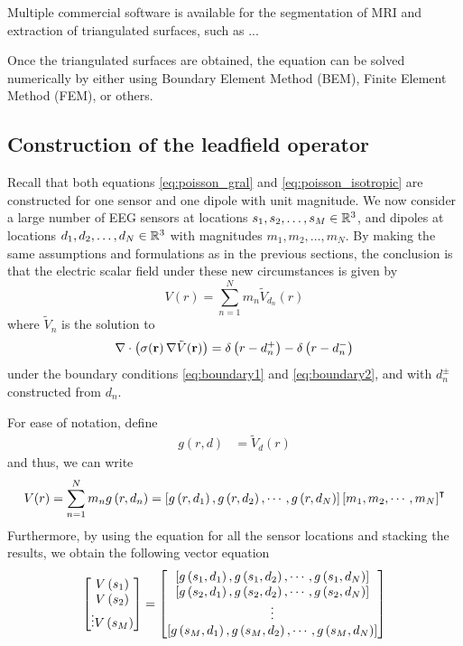 Multiple commercial software is available for the segmentation of MRI and extraction of triangulated surfaces, such as ...

Once the triangulated surfaces are obtained, the equation can be solved numerically by either using Boundary Element Method (BEM), Finite Element Method (FEM), or others.

\subsection{Construction of the leadfield operator}

Recall that both equations \eqref{eq:poisson_gral} and \eqref{eq:poisson_isotropic} are constructed for one sensor and one dipole with unit magnitude.
%
We now consider a large number of EEG sensors at locations $s_1, s_2, \dots, s_M \in \mathbb{R}^3$, and dipoles at locations $d_1, d_2, \dots, d_N \in \mathbb{R}^3$
with magnitudes $m_1, m_2, \dots, m_N$.
%
By making the same assumptions and formulations as in the previous sections, the conclusion is that the electric scalar field under these new circumstances is given by
\begin{equation}
V(r) = 
\sum_{n=1}^N m_n \tilde{V}_{d_n}(r)
\end{equation}
where $\tilde{V}_n$ is the solution to 
\begin{equation}
\nabla \cdot\left( \sigma(\mathbf{r})\, \nabla \tilde{V}(\mathbf{r})  \right) = 
{\delta\left( r-d_n^+ \right) - \delta\left( r-d_n^- \right)}
\end{equation}
under the boundary conditions \eqref{eq:boundary1} and \eqref{eq:boundary2}, and with $d_n^\pm$ constructed from $d_n$.

For ease of notation, define 
\begin{align}
g(r, d) &= \tilde{V}_d(r)
\end{align}
and thus, we can write
\begin{equation}
V(r) = 
\sum_{n=1}^N m_n g\left( r, d_n \right) = 
\left[ g\left( r, d_1 \right), g\left( r, d_2 \right), \cdots, g\left( r, d_N \right) \right]
\left[ m_1, m_2, \cdots, m_N \right]^\intercal
\label{eq:back1}
\end{equation}
Furthermore, by using the equation for all the sensor locations and stacking the results, we obtain the following vector equation
\begin{equation}
\begin{bmatrix}
V\left( s_1 \right) \\
V\left( s_2 \right) \\
\vdots
V\left( s_M \right)
\end{bmatrix}
=
\begin{bmatrix}
\left[ g\left( s_1, d_1 \right), g\left( s_1, d_2 \right), \cdots, g\left( s_1, d_N \right) \right] \\
\left[ g\left( s_2, d_1 \right), g\left( s_2, d_2 \right), \cdots, g\left( s_2, d_N \right) \right] \\
\vdots \\
\left[ g\left( s_M, d_1 \right), g\left( s_M, d_2 \right), \cdots, g\left( s_M, d_N \right) \right]
\end{bmatrix}
\label{eq:model3}
\end{equation}

